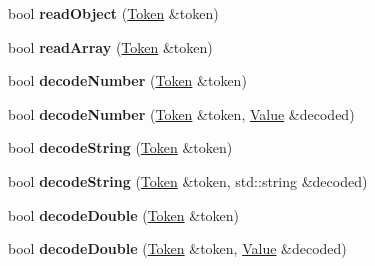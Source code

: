 \begin{DoxyCompactItemize}
\item 
\hypertarget{class_json_1_1_reader_a0068eb3d8e86e91f0e4806f60da66b9c}{}bool {\bfseries read\+Object} (\hyperlink{class_json_1_1_reader_1_1_token}{Token} \&token)\label{class_json_1_1_reader_a0068eb3d8e86e91f0e4806f60da66b9c}

\item 
\hypertarget{class_json_1_1_reader_afd9a30c0af205c9f327613f486fae6b8}{}bool {\bfseries read\+Array} (\hyperlink{class_json_1_1_reader_1_1_token}{Token} \&token)\label{class_json_1_1_reader_afd9a30c0af205c9f327613f486fae6b8}

\item 
\hypertarget{class_json_1_1_reader_a442d1f23edf0f4350f5eeab3ee3f7d46}{}bool {\bfseries decode\+Number} (\hyperlink{class_json_1_1_reader_1_1_token}{Token} \&token)\label{class_json_1_1_reader_a442d1f23edf0f4350f5eeab3ee3f7d46}

\item 
\hypertarget{class_json_1_1_reader_a72f426ce3fa384d14aa10e9dd75618f0}{}bool {\bfseries decode\+Number} (\hyperlink{class_json_1_1_reader_1_1_token}{Token} \&token, \hyperlink{class_json_1_1_value}{Value} \&decoded)\label{class_json_1_1_reader_a72f426ce3fa384d14aa10e9dd75618f0}

\item 
\hypertarget{class_json_1_1_reader_aaf736937912f5c9b8d221e57f209e3e0}{}bool {\bfseries decode\+String} (\hyperlink{class_json_1_1_reader_1_1_token}{Token} \&token)\label{class_json_1_1_reader_aaf736937912f5c9b8d221e57f209e3e0}

\item 
\hypertarget{class_json_1_1_reader_a801253570f16e91519652078fb12b8e6}{}bool {\bfseries decode\+String} (\hyperlink{class_json_1_1_reader_1_1_token}{Token} \&token, std\+::string \&decoded)\label{class_json_1_1_reader_a801253570f16e91519652078fb12b8e6}

\item 
\hypertarget{class_json_1_1_reader_a2420bbb7fd6d5d3e7e2fea894dd8f70f}{}bool {\bfseries decode\+Double} (\hyperlink{class_json_1_1_reader_1_1_token}{Token} \&token)\label{class_json_1_1_reader_a2420bbb7fd6d5d3e7e2fea894dd8f70f}

\item 
\hypertarget{class_json_1_1_reader_a5e4a66be7c413bca86078f14df5eb802}{}bool {\bfseries decode\+Double} (\hyperlink{class_json_1_1_reader_1_1_token}{Token} \&token, \hyperlink{class_json_1_1_value}{Value} \&decoded)\label{class_json_1_1_reader_a5e4a66be7c413bca86078f14df5eb802}


\end{DoxyCompactItemize}
